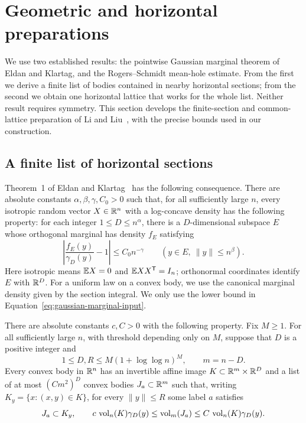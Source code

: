 \section{Geometric and horizontal preparations}
\label{sec:preliminaries}

We use two established results: the pointwise Gaussian marginal theorem
of Eldan and Klartag, and the Rogers--Schmidt mean-hole estimate. From
the first we derive a finite list of bodies contained in nearby horizontal
sections; from the second we obtain one horizontal lattice that works for
the whole list.  Neither result requires symmetry. This section develops the finite-section
and common-lattice preparation of Li and Liu~\cite[Proposition~4.1
and Lemma~4.2]{LL}, with the precise bounds used in our construction.

\subsection{A finite list of horizontal sections}

Theorem~1 of Eldan and Klartag~\cite{EK} has the following consequence.
There are absolute constants $\alpha,\beta,\gamma,C_0>0$ such that, for
all sufficiently large $n$, every isotropic random vector $X\in\mathbb R^n$
with a log-concave density has the following property: for each integer
$1\le D\le n^\alpha$, there is a $D$-dimensional subspace $E$ whose
orthogonal marginal has density $f_E$ satisfying
\begin{equation}
 \left|\frac{f_E(y)}{\gamma_D(y)}-1\right|
 \le C_0 n^{-\gamma}
 \qquad (y\in E,\ \|y\|\le n^\beta).
 \label{eq:gaussian-marginal-input}
\end{equation}
Here isotropic means $\mathbb E X=0$ and $\mathbb E XX^{\mathsf T}=I_n$; orthonormal
coordinates identify $E$ with $\mathbb R^D$.  For a uniform law on a convex
body, we use the canonical marginal density given by the section integral.
We only use the
lower bound in Equation~\eqref{eq:gaussian-marginal-input}.

\begin{lemma}
\label{lem:sections}
There are absolute constants $c,C>0$ with the following property.
Fix $M\ge1$.  For all sufficiently large $n$, with threshold depending
only on $M$, suppose that $D$ is a positive integer and
\[
 1\le D,R\le M(1+\log\log n)^M,\qquad m=n-D.
\]
Every convex body in $\mathbb R^n$ has an invertible affine image
$K\subset\mathbb R^m\times\mathbb R^D$ and a list of at most $(Cm^2)^D$ convex
bodies $J_a\subset\mathbb R^m$ such that, writing $K_y=\{x:(x,y)\in K\}$,
for every $\|y\|\le R$ some label $a$ satisfies
\begin{equation}
 J_a\subset K_y,
 \qquad
 c\,\operatorname{vol}_n(K)\gamma_D(y)
 \le \operatorname{vol}_m(J_a)
 \le C\,\operatorname{vol}_n(K)\gamma_D(y).
 \label{eq:section-labels}
\end{equation}
\end{lemma}

